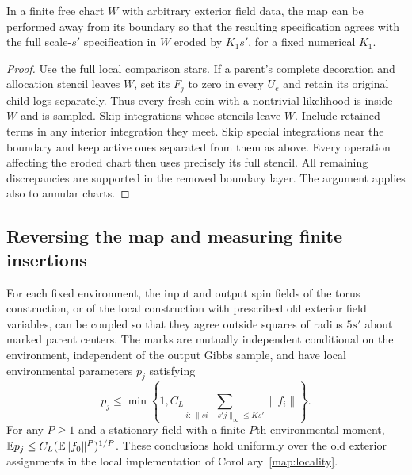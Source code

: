 \begin{corollary}\label{map:locality}
In a finite free chart $W$ with arbitrary exterior field data, the map
can be performed away from its boundary so that the resulting
specification agrees with the full scale-$s'$ specification in
$W$ eroded by $K_1s'$, for a fixed numerical $K_1$.
\end{corollary}

\begin{proof}
Use the full local comparison stars.  If a parent's complete decoration
and allocation stencil leaves $W$, set its $F_j$ to zero in every $U_e$
and retain its original child logs separately.  Thus every fresh coin
with a nontrivial likelihood is inside $W$ and is sampled.  Skip integrations
whose stencils leave $W$.  Include retained terms in any
interior integration they meet.  Skip special integrations near the
boundary and keep active ones separated from them as above.  Every
operation affecting the eroded chart then uses precisely its full
stencil.  All remaining discrepancies are supported in the removed
boundary layer.  The argument applies also to annular charts.
\end{proof}

\subsection{Reversing the map and measuring finite insertions}

\begin{proposition}\label{map:reversal}
For each fixed environment, the input and output spin fields of the
torus construction, or of the local construction with prescribed old
exterior field variables, can be
coupled so that they agree outside squares of radius $5s'$ about marked
parent centers.  The marks are mutually independent conditional on the
environment, independent of the output Gibbs sample, and have local
environmental parameters $p_j$ satisfying
\begin{equation}\label{map:mark-parameter}
 p_j\le\min\left\{1,C_L
       \sum_{i:\,\|si-s'j\|_\infty\le Ks'}\|f_i\|\right\}.
\end{equation}
For any $P\ge1$ and a stationary field with a finite $P$th environmental moment,
$\mathbb E p_j\le C_L(\mathbb E\|f_0\|^P)^{1/P}$.  These conclusions hold uniformly
over the old exterior assignments in the local implementation of
Corollary~\ref{map:locality}.
\end{proposition}

